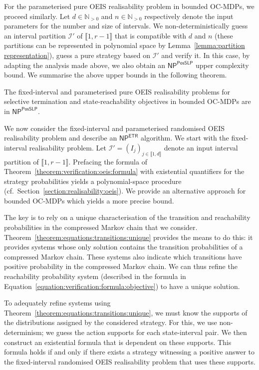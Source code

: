 \documentclass[a4paper,UKenglish,cleveref,autoref,thm-restate,colorlinks]{lipics-v2021}
\newcommand{\integerInterval}[1]{\llbracket{}#1\rrbracket{}}
\newcommand{\np}{\textsf{NP}}
\newcommand{\posSLP}{\textsf{PosSLP}}
\newcommand{\etr}{\textsf{ETR}}
\newcommand{\IN}{\mathbb{N}}
\newcommand{\INpos}{\IN_{>0}}
\newcommand{\counterUB}{r}
\newcommand{\intPart}{\mathcal{I}}
\newcommand{\interval}{I}
\newcommand{\intNum}{d}
\newcommand{\intSize}{n}
\newcommand{\intIndex}{j}
\begin{document}
For the parameterised pure OEIS realisability problem in bounded OC-MDPs, we proceed similarly.
Let $\intNum\in\INpos$ and $\intSize\in\INpos$ respectively denote the input parameters for the number and size of intervals.
We non-deterministically guess an interval partition $\intPart'$ of $\integerInterval{1, \counterUB-1}$ that is compatible with $\intNum$ and $\intSize$ (these partitions can be represented in polynomial space by Lemma~\ref{lemma:partition representation}), guess a pure strategy based on $\intPart'$ and verify it.
In this case, by adapting the analysis made above, we also obtain an $\np^{\posSLP}$ upper complexity bound.
We summarise the above upper bounds in the following theorem.

\begin{theorem}\label{theorem:realisability:bounded:pure}
  The fixed-interval and parameterised pure OEIS realisability problems for selective termination and state-reachability objectives in bounded OC-MDPs are in $\np^{\posSLP}$.
\end{theorem}

We now consider the fixed-interval and parameterised randomised OEIS realisability problem and describe an $\np^{\etr}$ algorithm.
We start with the fixed-interval realisability problem.
Let $\intPart' = (\interval_\intIndex)_{\intIndex\in\integerInterval{1, \intNum}}$ denote an input interval partition of $\integerInterval{1, \counterUB-1}$.
Prefacing the formula of Theorem~\ref{theorem:verification:oeis:formula} with existential quantifiers for the strategy probabilities yields a polynomial-space procedure (cf.~Section~\ref{section:realisability:oeis}).
We provide an alternative approach for bounded OC-MDPs which yields a more precise bound.

The key is to rely on a unique characterisation of the transition and reachability probabilities in the compressed Markov chain that we consider.
Theorem~\ref{theorem:equations:transitions:unique} provides the means to do this: it provides systems whose only solution contains the transition probabilities of a compressed Markov chain.
These systems also indicate which transitions have positive probability in the compressed Markov chain.
We can thus refine the reachability probability system (described in the formula in Equation~\eqref{equation:verification:formula:objective}) to have a unique solution.

To adequately refine systems using Theorem~\ref{theorem:equations:transitions:unique}, we must know the supports of the distributions assigned by the considered strategy.
For this, we use non-determinism; we guess the action supports for each state-interval pair.
We then construct an existential formula that is dependent on these supports.
This formula holds if and only if there exists a strategy witnessing a positive answer to the fixed-interval randomised OEIS realisability problem that uses these supports.
\end{document}
